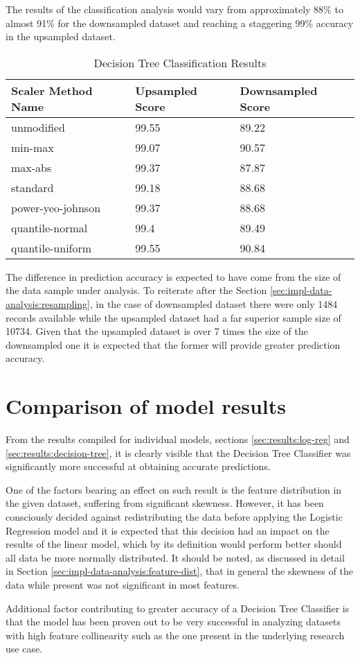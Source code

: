 The results of the classification analysis would vary from approximately 88\% to almost 91\% for the downsampled dataset and reaching a staggering 99\% accuracy in the upsampled dataset.
\begin{table}[h!]
\centering
\caption{Decision Tree Classification Results}
\label{tbl:results:decision-tree}
\begin{tabular}{@{}lll@{}}
\toprule
Scaler Method Name & Upsampled Score & Downsampled Score \\ \midrule
unmodified & 99.55& 89.22  \\
min-max & 99.07 & 90.57 \\
max-abs & 99.37 & 87.87 \\
standard & 99.18 & 88.68 \\
power-yeo-johnson & 99.37 & 88.68 \\
quantile-normal & 99.4 & 89.49 \\
quantile-uniform & 99.55 & 90.84 \\ \bottomrule
\end{tabular}
\end{table}

The difference in prediction accuracy is expected to have come from the size of the data sample under analysis. To reiterate after the Section \ref{sec:impl-data-analysis:resampling}, in the case of downsampled dataset there were only 1484 records available while the upsampled dataset had a far superior sample size of 10734. Given that the upsampled dataset is over 7 times the size of the downsampled one it is expected that the former will provide greater prediction accuracy.

\section{Comparison of model results}
From the results compiled for individual models, sections \ref{sec:results:log-reg} and \ref{sec:results:decision-tree}, it is clearly visible that the Decision Tree Classifier was significantly more successful at obtaining accurate predictions. 

One of the factors bearing an effect on such result is the feature distribution in the given dataset, suffering from significant skewness. However, it has been consciously decided against redistributing the data before applying the Logistic Regression model and it is expected that this decision had an impact on the results of the linear model, which by its definition would perform better should all data be more normally distributed. It should be noted, as discussed in detail in Section \ref{sec:impl-data-analysis:feature-dist}, that in general the skewness of the data while present was not significant in most features.

Additional factor contributing to greater accuracy of a Decision Tree Classifier is that the model has been proven out to be very successful in analyzing datasets with high feature collinearity \cite{Bertsimas2017Cart} such as the one present in the underlying research use case. 